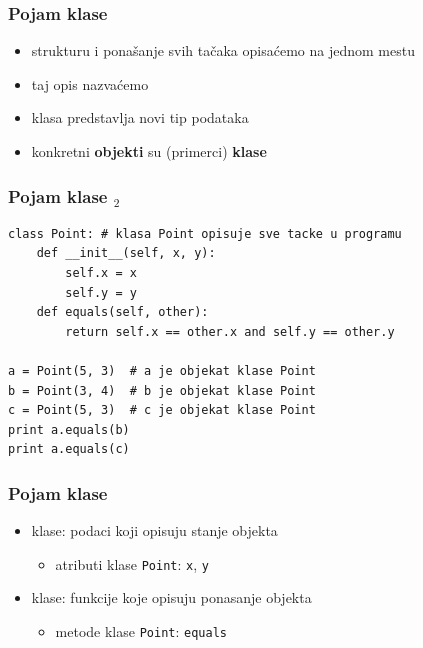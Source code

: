 \documentclass[utf8,compress]{beamer}
\begin{document}
\begin{frame}[fragile]
  \frametitle{Pojam klase}
  \begin{itemize}
    \item strukturu i ponašanje svih tačaka opisaćemo na jednom mestu
    \item taj opis nazvaćemo 
    \item klasa predstavlja novi tip podataka
    \item konkretni \textbf{objekti} su  (primerci) \textbf{klase}
  \end{itemize}
\end{frame}

\begin{frame}[fragile]
  \frametitle{Pojam klase $_2$}
\begin{verbatim}
class Point: # klasa Point opisuje sve tacke u programu
    def __init__(self, x, y):
        self.x = x
        self.y = y
    def equals(self, other):
        return self.x == other.x and self.y == other.y

a = Point(5, 3)  # a je objekat klase Point
b = Point(3, 4)  # b je objekat klase Point
c = Point(5, 3)  # c je objekat klase Point
print a.equals(b)
print a.equals(c)
\end{verbatim}
\end{frame}

\begin{frame}[fragile]
  \frametitle{Pojam klase}
  \begin{itemize}
    \item {} klase: podaci koji opisuju stanje objekta
    \begin{itemize}
      \item atributi klase \texttt{Point}: \texttt{x}, \texttt{y}
    \end{itemize}
    \item {} klase: funkcije koje opisuju ponasanje objekta
    \begin{itemize}
      \item metode klase \texttt{Point}: \texttt{equals}
    \end{itemize}
  \end{itemize}
\end{frame}
\end{document}
